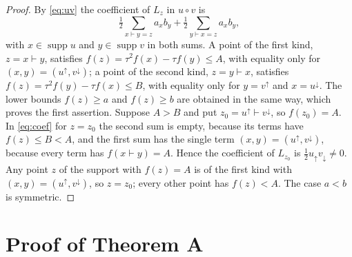 \documentclass[11pt]{amsart}
\theoremstyle{definition}
\theoremstyle{remark}
\newcommand{\qa}{\vdash}
\newcommand{\supp}{\operatorname{supp}}
\newcommand{\up}{{\uparrow}}
\newcommand{\dn}{{\downarrow}}
\begin{document}
\begin{proof}
By \eqref{eq:uv} the coefficient of $L_z$ in $u\circ v$ is
\begin{equation}\label{eq:coef}
\tfrac12\sum_{x\qa y=z}a_xb_y+\tfrac12\sum_{y\qa x=z}a_xb_y,
\end{equation}
with $x\in\supp u$ and $y\in\supp v$ in both sums. A point of the first kind, $z=x\qa y$, satisfies $f(z)=\tau^2f(x)-\tau f(y)\le A$, with equality only for $(x,y)=(u^\up,v^\dn)$; a point of the second kind, $z=y\qa x$, satisfies $f(z)=\tau^2f(y)-\tau f(x)\le B$, with equality only for $y=v^\up$ and $x=u^\dn$. The lower bounds $f(z)\ge a$ and $f(z)\ge b$ are obtained in the same way, which proves the first assertion. Suppose $A>B$ and put $z_0=u^\up\qa v^\dn$, so $f(z_0)=A$. In \eqref{eq:coef} for $z=z_0$ the second sum is empty, because its terms have $f(z)\le B<A$, and the first sum has the single term $(x,y)=(u^\up,v^\dn)$, because every term has $f(x\qa y)=A$. Hence the coefficient of $L_{z_0}$ is $\frac12u_\up v_\dn\ne0$. Any point $z$ of the support with $f(z)=A$ is of the first kind with $(x,y)=(u^\up,v^\dn)$, so $z=z_0$; every other point has $f(z)<A$. The case $a<b$ is symmetric.
\end{proof}

\section{Proof of Theorem A}
\end{document}
